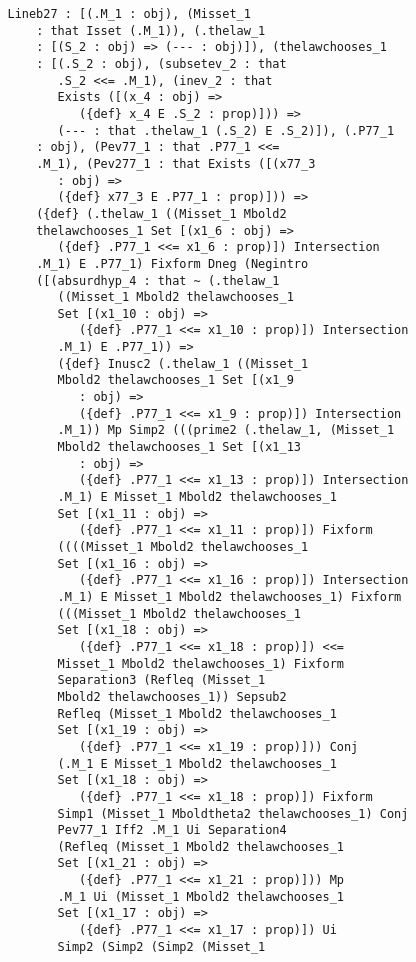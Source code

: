 \documentclass[12pt]{article}
\begin{document}
\begin{verbatim}
   Lineb27 : [(.M_1 : obj), (Misset_1 
       : that Isset (.M_1)), (.thelaw_1 
       : [(S_2 : obj) => (--- : obj)]), (thelawchooses_1 
       : [(.S_2 : obj), (subsetev_2 : that 
          .S_2 <<= .M_1), (inev_2 : that 
          Exists ([(x_4 : obj) => 
             ({def} x_4 E .S_2 : prop)])) => 
          (--- : that .thelaw_1 (.S_2) E .S_2)]), (.P77_1 
       : obj), (Pev77_1 : that .P77_1 <<= 
       .M_1), (Pev277_1 : that Exists ([(x77_3 
          : obj) => 
          ({def} x77_3 E .P77_1 : prop)])) => 
       ({def} (.thelaw_1 ((Misset_1 Mbold2 
       thelawchooses_1 Set [(x1_6 : obj) => 
          ({def} .P77_1 <<= x1_6 : prop)]) Intersection 
       .M_1) E .P77_1) Fixform Dneg (Negintro 
       ([(absurdhyp_4 : that ~ (.thelaw_1 
          ((Misset_1 Mbold2 thelawchooses_1 
          Set [(x1_10 : obj) => 
             ({def} .P77_1 <<= x1_10 : prop)]) Intersection 
          .M_1) E .P77_1)) => 
          ({def} Inusc2 (.thelaw_1 ((Misset_1 
          Mbold2 thelawchooses_1 Set [(x1_9 
             : obj) => 
             ({def} .P77_1 <<= x1_9 : prop)]) Intersection 
          .M_1)) Mp Simp2 (((prime2 (.thelaw_1, (Misset_1 
          Mbold2 thelawchooses_1 Set [(x1_13 
             : obj) => 
             ({def} .P77_1 <<= x1_13 : prop)]) Intersection 
          .M_1) E Misset_1 Mbold2 thelawchooses_1 
          Set [(x1_11 : obj) => 
             ({def} .P77_1 <<= x1_11 : prop)]) Fixform 
          ((((Misset_1 Mbold2 thelawchooses_1 
          Set [(x1_16 : obj) => 
             ({def} .P77_1 <<= x1_16 : prop)]) Intersection 
          .M_1) E Misset_1 Mbold2 thelawchooses_1) Fixform 
          (((Misset_1 Mbold2 thelawchooses_1 
          Set [(x1_18 : obj) => 
             ({def} .P77_1 <<= x1_18 : prop)]) <<= 
          Misset_1 Mbold2 thelawchooses_1) Fixform 
          Separation3 (Refleq (Misset_1 
          Mbold2 thelawchooses_1)) Sepsub2 
          Refleq (Misset_1 Mbold2 thelawchooses_1 
          Set [(x1_19 : obj) => 
             ({def} .P77_1 <<= x1_19 : prop)])) Conj 
          (.M_1 E Misset_1 Mbold2 thelawchooses_1 
          Set [(x1_18 : obj) => 
             ({def} .P77_1 <<= x1_18 : prop)]) Fixform 
          Simp1 (Misset_1 Mboldtheta2 thelawchooses_1) Conj 
          Pev77_1 Iff2 .M_1 Ui Separation4 
          (Refleq (Misset_1 Mbold2 thelawchooses_1 
          Set [(x1_21 : obj) => 
             ({def} .P77_1 <<= x1_21 : prop)])) Mp 
          .M_1 Ui (Misset_1 Mbold2 thelawchooses_1 
          Set [(x1_17 : obj) => 
             ({def} .P77_1 <<= x1_17 : prop)]) Ui 
          Simp2 (Simp2 (Simp2 (Misset_1 

\end{verbatim}
\end{document}
